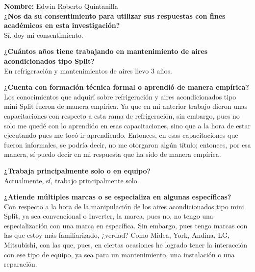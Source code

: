 {{    \vspace{1cm}



    \textbf{Nombre:} Edwin Roberto Quintanilla\\

    \textbf{¿Nos da su consentimiento para utilizar sus respuestas con fines académicos en esta investigación?}\\
    Sí, doy mi consentimiento.

    \textbf{¿Cuántos años tiene trabajando en mantenimiento de aires acondicionados tipo Split?}\\
    En refrigeración y mantenimientos de aires llevo 3 años.

    \textbf{¿Cuenta con formación técnica formal o aprendió de manera empírica?}\\
    Los conocimientos que adquirí sobre refrigeración y aires acondicionados tipo mini Split fueron de manera empírica. Ya que en mi anterior trabajo dieron unas capacitaciones con respecto a esta rama de refrigeración, sin embargo, pues no solo me quedé con lo aprendido en esas capacitaciones, sino que a la hora de estar ejecutando pues me tocó ir aprendiendo. Entonces, en esas capacitaciones que fueron informales, se podría decir, no me otorgaron algún título; entonces, por esa manera, sí puedo decir en mi respuesta que ha sido de manera empírica.

    \textbf{¿Trabaja principalmente solo o en equipo?}\\
    Actualmente, sí, trabajo principalmente solo.

    \textbf{¿Atiende múltiples marcas o se especializa en algunas específicas?}\\
    Con respecto a la hora de la manipulación de los aires acondicionados tipo mini Split, ya sea convencional o Inverter, la marca, pues no, no tengo una especialización con una marca en específica. Sin embargo, pues tengo marcas con las que estoy más familiarizado, ¿verdad? Como Midea, York, Andina, LG, Mitsubishi, con las que, pues, en ciertas ocasiones he logrado tener la interacción con ese tipo de equipo, ya sea para un mantenimiento, una instalación o una reparación.

}}

